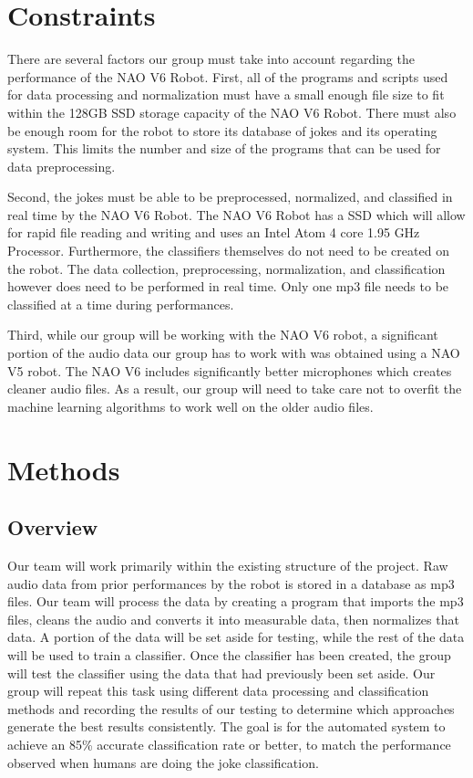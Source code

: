 \documentclass[onecolumn, draftclsnofoot,10pt, compsoc]{IEEEtran}
\begin{document}
\section{Constraints}
There are several factors our group must take into account regarding the performance of the NAO V6 Robot. First, all of the programs and scripts used for data processing and normalization must have a small enough file size to fit within the 128GB SSD storage capacity of the NAO V6 Robot. There must also be enough room for the robot to store its database of jokes and its operating system. This limits the number and size of the programs that can be used for data preprocessing.\par
\vspace{.3cm}
\noindent Second, the jokes must be able to be preprocessed, normalized, and classified in real time by the NAO V6 Robot. The NAO V6 Robot has a SSD which will allow for rapid file reading and writing and uses an Intel Atom 4 core 1.95 GHz Processor. Furthermore, the classifiers themselves do not need to be created on the robot. The data collection, preprocessing, normalization, and classification however does need to be performed in real time. Only one mp3 file needs to be classified at a time during performances.\par
\vspace{.3cm}
\noindent Third, while our group will be working with the NAO V6 robot, a significant portion of the audio data our group has to work with was obtained using a NAO V5 robot. The NAO V6 includes significantly better microphones which creates cleaner audio files. As a result, our group will need to take care not to overfit the machine learning algorithms to work well on the older audio files.

\section{Methods}
\subsection{Overview}
Our team will work primarily within the existing structure of the project. Raw audio data from prior performances by the robot is stored in a database as mp3 files. Our team will process the data by creating a program that imports the mp3 files, cleans the audio and converts it into measurable data, then normalizes that data. A portion of the data will be set aside for testing, while the rest of the data will be used to train a classifier. Once the classifier has been created, the group will test the classifier using the data that had previously been set aside. Our group will repeat this task using different data processing and classification methods and recording the results of our testing to determine which approaches generate the best results consistently. The goal is for the automated system to achieve an 85\% accurate classification rate or better, to match the performance observed when humans are doing the joke classification.
\end{document}
